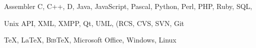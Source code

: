 \documentclass[10pt]{article}
\renewcommand{\section}[2]%
        {\pagebreak[2]\vspace{1.4\baselineskip}%
         \phantomsection\addcontentsline{toc}{section}{#1}%
         \hspace{0in}%
         \marginpar{
         \raggedright \scshape #1}#2}
\renewcommand{\subsection}[2]%
        {\pagebreak[2]\vspace{0.3\baselineskip}%
         \phantomsection\addcontentsline{toc}{subsection}{#1}%
         \hspace{0in}%
         \marginpar{\scriptsize
         \raggedright \scshape #1}#2}
\newcommand{\blankline}{\quad\pagebreak[2]}
\begin{document}
%

\blankline

Assembler
C, C++, D, Java, JavaScript, Pascal, Python, Perl, PHP, Ruby,
SQL,

\blankline

Unix API,
XML, XMPP, Qt, UML,
(RCS, CVS, SVN, Git

\blankline

\TeX{}, \LaTeX{}, B\textsc{ib}\TeX{}, Microsoft Office,
Windows,
 Linux
\end{document}
